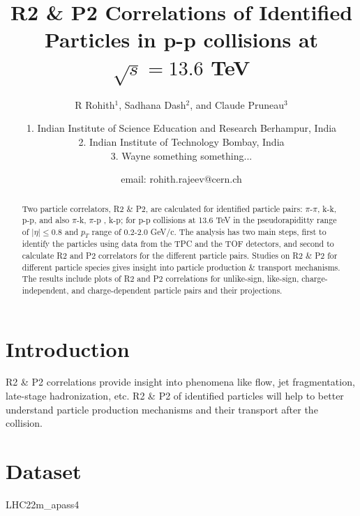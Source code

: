 \documentclass[ALICE,manyauthors]{ALICE_analysis_notes}
\begin{document}
%
%
%
\begin{titlepage}
%
\PHdate{\today}
%
\title{R2 \& P2 Correlations of Identified Particles in p-p collisions at \\$\sqrt{s}=13.6$ TeV}%
%
\author{R Rohith$^{1}$, Sadhana Dash$^2$, and Claude Pruneau$^3$}
\author{
1. Indian Institute of Science Education and Research Berhampur, India\\
2. Indian Institute of Technology Bombay, India\\
3. Wayne something something...
}
\author{email: rohith.rajeev@cern.ch}%
%
%
\linenumbers
\begin{abstract}
Two particle correlators, R2 \& P2, are calculated for identified particle pairs: $\pi$-$\pi$, k-k, p-p, and also $\pi$-k, $\pi$-p , k-p; for p-p collisions at 13.6 TeV in the pseudorapiditty range of $|\eta|\leq0.8$ and $p_T$ range of 0.2-2.0 GeV/c. The analysis has two main steps, first to identify the particles using data from the TPC and the TOF detectors, and second to calculate R2 and P2 correlators for the different particle pairs. Studies on R2 \& P2 for different particle species gives insight into particle production \& transport mechanisms. The results include plots of R2 and P2 correlations for unlike-sign, like-sign, charge-independent, and charge-dependent particle pairs and their projections.
\end{abstract}
\end{titlepage}
\linenumbers
\section[Introduction]{Introduction}
R2 \& P2 correlations provide insight into phenomena like flow, jet fragmentation, late-stage hadronization, etc. R2 \& P2 of identified particles will help to better understand particle production mechanisms and their transport after the collision. 
\section{Dataset}
LHC22m\_apass4
\end{document}
